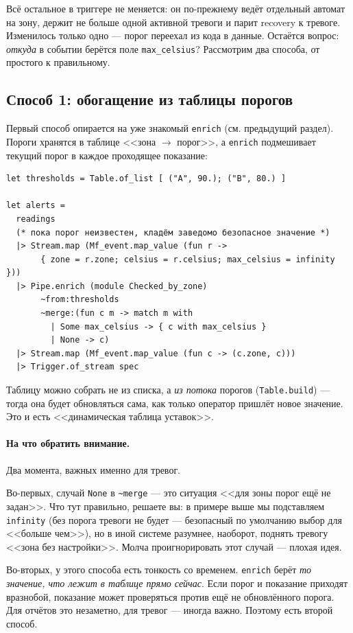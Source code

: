 \documentclass[11pt,a4paper]{article}
\begin{document}
Всё остальное в триггере не меняется: он по-прежнему ведёт отдельный
автомат на зону, держит не больше одной активной тревоги и парит
recovery к тревоге. Изменилось только одно --- порог переехал из кода в
данные. Остаётся вопрос: \emph{откуда} в событии берётся поле
\texttt{max\_celsius}? Рассмотрим два способа, от простого к
правильному.

\subsection{Способ 1: обогащение из таблицы порогов}

Первый способ опирается на уже знакомый \texttt{enrich} (см. предыдущий
раздел). Пороги хранятся в таблице <<зона $\to$ порог>>, а
\texttt{enrich} подмешивает текущий порог в каждое проходящее показание:

\begin{lstlisting}
let thresholds = Table.of_list [ ("A", 90.); ("B", 80.) ]

let alerts =
  readings
  (* пока порог неизвестен, кладём заведомо безопасное значение *)
  |> Stream.map (Mf_event.map_value (fun r ->
       { zone = r.zone; celsius = r.celsius; max_celsius = infinity }))
  |> Pipe.enrich (module Checked_by_zone)
       ~from:thresholds
       ~merge:(fun c m -> match m with
         | Some max_celsius -> { c with max_celsius }
         | None -> c)
  |> Stream.map (Mf_event.map_value (fun c -> (c.zone, c)))
  |> Trigger.of_stream spec
\end{lstlisting}

Таблицу можно собрать не из списка, а \emph{из потока} порогов
(\texttt{Table.build}) --- тогда она будет обновляться сама, как только
оператор пришлёт новое значение. Это и есть <<динамическая таблица
уставок>>.

\paragraph{На что обратить внимание.} Два момента, важных именно для
тревог.

Во-первых, случай \texttt{None} в \texttt{\textasciitilde{}merge} --- это
ситуация <<для зоны порог ещё не задан>>. Что тут правильно, решаете вы:
в примере выше мы подставляем \texttt{infinity} (без порога тревоги не
будет --- безопасный по умолчанию выбор для <<больше чем>>), но в иной
системе разумнее, наоборот, поднять тревогу <<зона без настройки>>.
Молча проигнорировать этот случай --- плохая идея.

Во-вторых, у этого способа есть тонкость со временем. \texttt{enrich}
берёт \emph{то значение, что лежит в таблице прямо сейчас}. Если порог и
показание приходят вразнобой, показание может проверяться против ещё не
обновлённого порога. Для отчётов это незаметно, для тревог --- иногда
важно. Поэтому есть второй способ.
\end{document}
